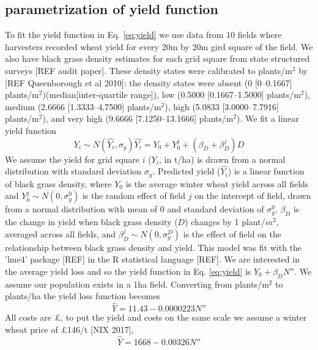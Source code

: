 \documentclass[12pt, a4paper]{article}
\begin{document}
\subsection*{parametrization of yield function}
To fit the yield function in Eq. \ref{eq:yield} we use data from 10 fields where harvesters recorded wheat yield for every 20m by 20m gird square of the field. We also have black grass density estimates for each grid square from state structured surveys [REF audit paper]. These density states were calibrated to plants/m$^2$ by [REF Queenborough et al 2010]: the density states were absent (0 [0--0.1667] plants/m$^2$)(median[inter-quartile range]), low (0.5000 [0.1667--1.5000] plants/m$^2$), medium (2.6666 [1.3333--4.7500] plants/m$^2$), high (5.0833 [3.0000--7.7916] plants/m$^2$), and very high (9.6666 [7.1250--13.1666] plants/m$^2$). We fit a linear yield function 
\begin{subequations}
\label{eq:est_yield}
\begin{equation}
 Y_i \sim N(\widehat{Y_i}, \sigma_y)
\end{equation}
\begin{equation}
	\widehat{Y_i} = Y_0 + Y_0^j + (\beta_D + \beta_D^j)D 
\end{equation}
\end{subequations}
We assume the yield for grid square $i$ ($Y_i$, in t/ha) is drawn from a normal distribution with standard deviation $\sigma_y$. Predicted yield ($\widehat{Y_i}$) is a linear function of black grass density, where $Y_0$ is the average winter wheat yield across all fields and $Y_0^j \sim N(0, \sigma_y^0)$ is the random effect of field $j$ on the intercept of field, drawn from a normal distribution with mean of 0 and standard deviation of $\sigma_y^0$. $\beta_D$ is the change in yield when black grass density ($D$) changes by 1 plant/$m^2$, averaged across all fields, and $\beta_D^j \sim N(0, \sigma_y^D)$ is the effect of field on the relationship between black grass density and yield. This model was fit with the 'lme4' package [REF] in the R statistical language [REF]. We are interested in the average yield loss and so the yield function in Eq. \ref{eq:yield} is $Y_0 + \beta_D N''$. We assume our population exists in a 1ha field. Converting from plants/m$^2$ to plants/ha the yield loss function becomes 
\begin{equation}
	\widehat{Y} = 11.43 - 0.0000223 N'' 
\end{equation}
All costs are \pounds, to put the yield and costs on the same scale we assume a winter wheat price of \pounds 146/t [NIX 2017], 
\begin{equation}
	\widehat{Y} = 1668 - 0.00326 N'' 
\end{equation}
\end{document}
